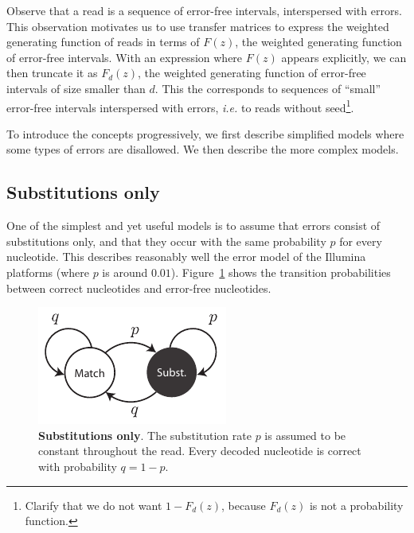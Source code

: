 \documentclass{article}
\begin{document}
Observe that a read is a sequence of error-free intervals, interspersed
with errors. This observation motivates us to use transfer matrices to
express the weighted generating function of reads in terms of $F(z)$, the
weighted generating function of error-free intervals. With an expression
where $F(z)$ appears explicitly, we can then truncate it as $F_d(z)$, the
weighted generating function of error-free intervals of size smaller than
$d$. This the corresponds to sequences of ``small'' error-free intervals
interspersed with errors, \textit{i.e.} to reads without
seed\footnote{Clarify that we do not want $1-F_d(z)$, because $F_d(z)$ is
not a probability function.}.

To introduce the concepts progressively, we first describe simplified
models where some types of errors are disallowed. We then describe the
more complex models.






\subsection{Substitutions only}
\label{sec:substitutions}

One of the simplest and yet useful models is to assume that errors consist
of substitutions only, and that they occur with the same probability $p$
for every nucleotide. This describes reasonably well the error model of
the Illumina platforms (where $p$ is around $0.01$).
Figure~\ref{fig:subonly} shows the transition probabilities between
correct nucleotides and error-free nucleotides.

\begin{figure}[h]
\centering
\includegraphics[scale=0.9]{substitutions_only.pdf}
\caption{\textbf{Substitutions only}. 
The substitution rate $p$ is assumed to be constant throughout the read.
Every decoded nucleotide is correct with probability $q = 1-p$.}
\label{fig:subonly}
\end{figure}
\end{document}
